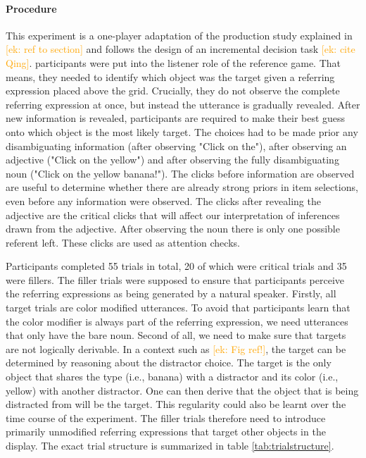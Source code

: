 \documentclass[a4paper,man,floatsintext,natbib,donotrepeattitle]{apa6}
\newcommand{\ek}[1]{\textcolor{Orange}{[ek: #1]}}
\begin{document}
\paragraph{Procedure}
This experiment is a one-player adaptation of the production study explained in \ek{ref to section} and follows the design of an incremental decision task \ek{cite Qing}. participants were put into the listener role of the reference game. That means, they needed to identify which object was the target given a referring expression placed above the grid. Crucially, they do not observe the complete referring expression at once, but instead the utterance is gradually revealed. After new information is revealed, participants are required to make their best guess onto which object is the most likely target. The choices had to be made prior any disambiguating information (after observing "Click on the"), after observing an adjective ("Click on the yellow") and after observing the fully disambiguating noun ("Click on the yellow banana!"). The clicks before information are observed are useful to determine whether there are already strong priors in item selections, even before any information were observed. The clicks after revealing the adjective are the critical clicks that will affect our interpretation of inferences drawn from the adjective. After observing the noun there is only one possible referent left. These clicks are used as attention checks.

Participants completed 55 trials in total, 20 of which were critical trials and 35 were fillers. The filler trials were supposed to ensure that participants perceive the referring expressions as being generated by a natural speaker. Firstly, all target trials are color modified utterances. To avoid that participants learn that the color modifier is always part of the referring expression, we need utterances that only have the bare noun. Second of all, we need to make sure that targets are not logically derivable. In a context such as \ek{Fig ref!}, the target can be determined by reasoning about the distractor choice. The target is the only object that shares the type (i.e., banana) with a distractor and its color (i.e., yellow) with another distractor. One can then derive that the object that is being distracted from will be the target. This regularity could also be learnt over the time course of the experiment. The filler trials therefore need to introduce primarily unmodified referring expressions that target other objects in the display. The exact trial structure is summarized in table \ref{tab:trialstructure}.
\end{document}
